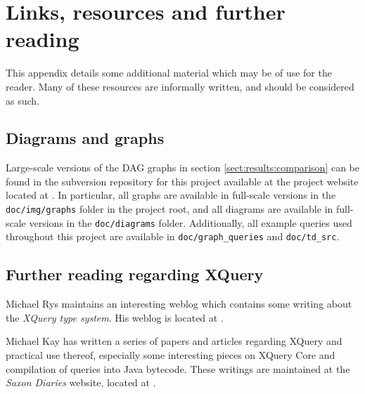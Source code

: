 \chapter{Links, resources and further reading}
\label{appendix:links_and_resources}
This appendix details some additional material which may be of use for the
reader. Many of these resources are informally written, and should
be considered as such.

\section{Diagrams and graphs}
Large-scale versions of the DAG graphs in section \ref{sect:results:comparison}
can be found in the subversion repository for this project available at the
project website located at 
.
In particular, all graphs are available in full-scale versions in the
\texttt{doc/img/graphs} folder in the project root, and all diagrams are
available in full-scale versions in the \texttt{doc/diagrams} folder.
Additionally, all example queries used throughout this project are available
in \texttt{doc/graph\_queries} and \texttt{doc/td\_src}.

\section{Further reading regarding XQuery}
Michael Rys maintains an interesting weblog which contains some writing about
the \emph{XQuery type system}. His weblog is located at
.

Michael Kay has written a series of papers and articles regarding XQuery and
practical use thereof, especially some interesting pieces on XQuery Core and
compilation of queries into Java bytecode. These writings are maintained at the
\emph{Saxon Diaries} website, located at
.

